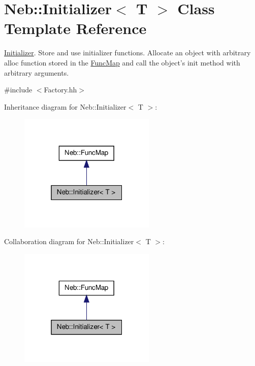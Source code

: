 \hypertarget{classNeb_1_1Initializer}{\section{\-Neb\-:\-:\-Initializer$<$ \-T $>$ \-Class \-Template \-Reference}
\label{classNeb_1_1Initializer}
}


\hyperlink{classNeb_1_1Initializer}{\-Initializer}. \-Store and use initializer functions. \-Allocate an object with arbitrary alloc function stored in the \hyperlink{classNeb_1_1FuncMap}{\-Func\-Map} and call the object's {\ttfamily init} method with arbitrary arguments.  




{\ttfamily \#include $<$\-Factory.\-hh$>$}



\-Inheritance diagram for \-Neb\-:\-:\-Initializer$<$ \-T $>$\-:\nopagebreak
\begin{figure}[H]
\begin{center}
\leavevmode
\includegraphics[width=184pt]{classNeb_1_1Initializer__inherit__graph}
\end{center}
\end{figure}


\-Collaboration diagram for \-Neb\-:\-:\-Initializer$<$ \-T $>$\-:\nopagebreak
\begin{figure}[H]
\begin{center}
\leavevmode
\includegraphics[width=184pt]{classNeb_1_1Initializer__coll__graph}
\end{center}
\end{figure}
